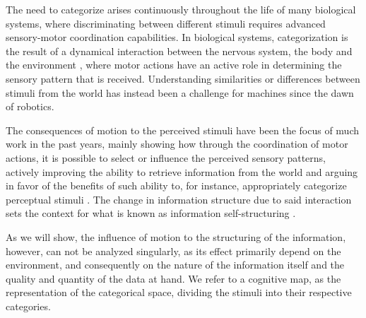 \documentclass[]{interact}
\theoremstyle{plain}%
\theoremstyle{definition}
\theoremstyle{remark}
\begin{document}
The need to categorize arises continuously throughout the life of many biological systems, where discriminating between different stimuli requires advanced sensory-motor coordination capabilities. In biological systems, categorization is the result of a dynamical interaction between the nervous system, the body and the environment \cite{Pfeifer1088}, where motor actions have an active role in determining the sensory pattern that is received. Understanding similarities or differences between stimuli from the world has instead been a challenge for machines since the dawn of robotics.  

The consequences of motion to the perceived stimuli have been the focus of much work in the past years, mainly showing how through the coordination of motor actions, it is possible to select or influence the perceived sensory patterns, actively improving the ability to retrieve information from the world and arguing in favor of the benefits of such ability to, for instance, appropriately categorize perceptual stimuli \cite{lungarella2005methods, sporns2006evolving, pfeifer2007information}. The change in information structure due to said interaction sets the context for what is known as information self-structuring \cite{pfeifer2007information}. 

As we will show, the influence of motion to the structuring of the information, however, can not be analyzed singularly, as its effect primarily depend on the environment, and consequently on the nature of the information itself and the quality and quantity of the data at hand. We refer to a cognitive map, as the representation of the categorical space, dividing the stimuli into their respective categories. 

%

\end{document}
